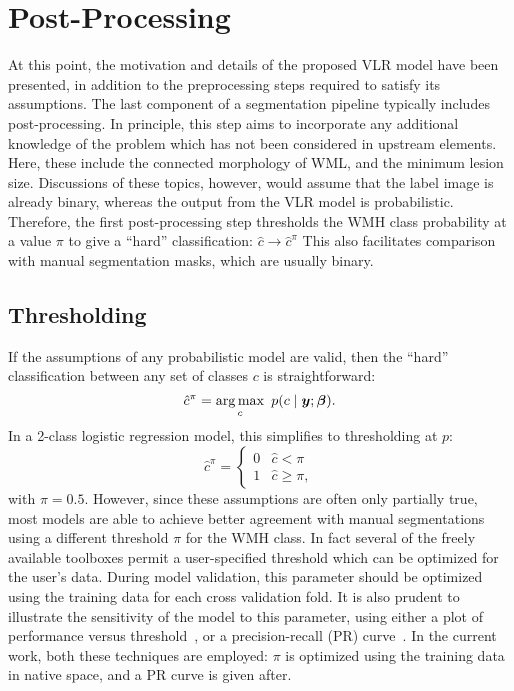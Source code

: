 \section{Post-Processing}\label{s:vlr-post}
At this point, the motivation and details of the proposed VLR model have been presented,
in addition to the preprocessing steps required to satisfy its assumptions.
The last component of a segmentation pipeline typically includes post-processing.
In principle, this step aims to incorporate any additional knowledge of the problem
which has not been considered in upstream elements.
Here, these include the connected morphology of WML, and the minimum lesion size.
Discussions of these topics, however, would assume that the label image is already binary,
whereas the output from the VLR model is probabilistic.
Therefore, the first post-processing step
thresholds the WMH class probability at a value $\pi$ to give a ``hard'' classification:
$\hat{c}\rightarrow \hat{c}^{\pi}$
This also facilitates comparison with manual segmentation masks, which are usually binary.
\subsection{Thresholding}\label{ss:vlr-thr}
If the assumptions of any probabilistic model are valid,
then the ``hard'' classification between any set of classes $c$ is straightforward:
\begin{equation}
  \hat{c}^{\pi} = \underset{c}{\arg\max}\enspace p(c\mid\bm{y};\bm{\beta}).
\end{equation}
In a 2-class logistic regression model, this simplifies to thresholding at $p$:
\begin{equation}
  \hat{c}^{\pi} = \begin{cases} 0 & \hat{c} < \pi \\ 1 & \hat{c} \ge \pi, \end{cases}
\end{equation}
with $\pi = 0.5$.
However, since these assumptions are often only partially true,
most models are able to achieve better agreement with manual segmentations
using a different threshold $\pi$ for the WMH class.
In fact several of the freely available toolboxes
permit a user-specified threshold which can be optimized for the user's data.
During model validation,
this parameter should be optimized using the training data for each cross validation fold.
It is also prudent to illustrate the sensitivity of the model to this parameter, using either
a plot of performance versus threshold~\cite{Steenwijk2013}, or
a precision-recall (PR) curve~\cite{Arbelaez2011}.
In the current work, both these techniques are employed:
$\pi$ is optimized using the training data in native space,
and a PR curve is given after. %
